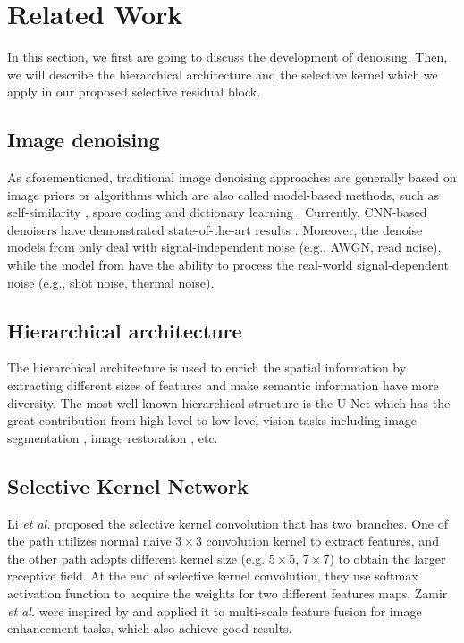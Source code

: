 \documentclass{article}
\begin{document}
\section{Related Work}
In this section, we first are going to discuss the development of denoising. Then, we will describe the hierarchical architecture and the selective kernel which we apply in our proposed selective residual block.

\subsection{Image denoising} As aforementioned, traditional image denoising approaches are generally based on image priors or algorithms which are also called model-based methods, such as self-similarity \cite{01,02,21}, spare coding \cite{22,23} and dictionary learning \cite{22,25}. Currently, CNN-based denoisers have demonstrated state-of-the-art results \cite{03,04,13,14,15}. Moreover, the denoise models from \cite{04,11,14,15,16,17,44} only deal with signal-independent noise (e.g., AWGN, read noise), while the model from \cite{12,26,27,28,29} have the ability to process the real-world signal-dependent noise (e.g., shot noise, thermal noise).

\subsection{Hierarchical architecture} The hierarchical architecture is used to enrich the spatial information by extracting different sizes of features and make semantic information have more diversity. The most well-known hierarchical structure is the U-Net \cite{13} which has the great contribution from high-level to low-level vision tasks including image segmentation \cite{31,32}, image restoration \cite{14,15,30}, etc.

\subsection{Selective Kernel Network} Li \textit{et al.} proposed the selective kernel convolution that has two branches. One of the path utilizes normal naive $3 \times 3$ convolution kernel to extract features, and the other path adopts different kernel size (e.g. $5 \times 5$, $7 \times 7$) to obtain the larger receptive field. At the end of selective kernel convolution, they use softmax activation function to acquire the weights for two different features maps. Zamir \textit{et al.} \cite{20} were inspired by \cite{19} and applied it to multi-scale feature fusion for image enhancement tasks, which also achieve good results.
\end{document}
